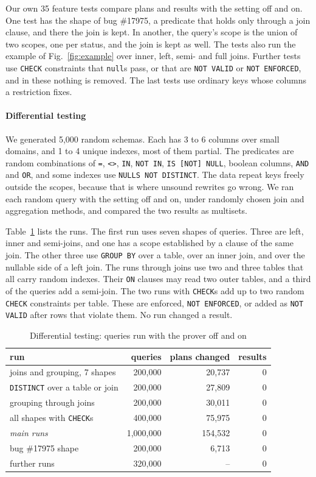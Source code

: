 \documentclass[conference]{IEEEtran}
\theoremstyle{definition}
\newcommand{\sql}[1]{\texttt{#1}}
\newcommand{\nul}{\texttt{null}}
\begin{document}
Our own 35 feature tests compare plans and results with the setting off and on. One test has the shape of bug
\#17975, a predicate that holds only through a join clause, and there the join is kept. In another, the query's scope
is the union of two scopes, one per status, and the join is kept as well. The tests also run the example of
Fig.~\ref{fig:example} over inner, left, semi- and full joins. Further tests use \sql{CHECK} constraints that \nul s
pass, or that are \sql{NOT VALID} or \sql{NOT ENFORCED}, and in these nothing is removed. The last tests use ordinary keys
whose columns a restriction fixes.

\paragraph*{Differential testing} We generated 5{,}000 random schemas. Each has 3 to 6 columns over small domains,
and 1 to 4 unique indexes, most of them partial. The predicates are random combinations of \sql{=}, \sql{<>}, \sql{IN},
\sql{NOT IN}, \sql{IS [NOT] NULL}, boolean columns, \sql{AND} and \sql{OR}, and some indexes use \sql{NULLS NOT DISTINCT}.
The data repeat keys freely outside the scopes, because that is where unsound rewrites go wrong. We ran each random query
with the setting off and on, under randomly chosen join and aggregation methods, and compared the two results as
multisets.

Table~\ref{tab:runs} lists the runs. The first run uses seven shapes of queries. Three are left, inner and semi-joins,
and one has a scope established by a clause of the same join. The other three use \sql{GROUP BY} over a table, over an
inner join, and over the nullable side of a left join. The runs through joins use two and three tables that all carry random indexes. Their \sql{ON}
clauses may read two outer tables, and a third of the queries add a semi-join. The two runs with \sql{CHECK}s add up to two random
\sql{CHECK} constraints per table. These are enforced, \sql{NOT ENFORCED}, or added as \sql{NOT VALID} after rows that
violate them. No run changed a result.

\begin{table}[t]\centering\footnotesize\setlength{\tabcolsep}{3pt}
\caption{Differential testing: queries run with the prover off and on}\label{tab:runs}
\begin{tabular}{@{}lrrr@{}}\toprule
run & queries & plans changed & results\\\midrule
joins and grouping, 7 shapes & 200{,}000 & 20{,}737 & 0\\
\sql{DISTINCT} over a table or join & 200{,}000 & 27{,}809 & 0\\
grouping through joins & 200{,}000 & 30{,}011 & 0\\
all shapes with \sql{CHECK}s & 400{,}000 & 75{,}975 & 0\\\midrule
\emph{main runs} & 1{,}000{,}000 & 154{,}532 & 0\\\midrule
bug \#17975 shape & 200{,}000 & 6{,}713 & 0\\
further runs & 320{,}000 & -- & 0\\\bottomrule
\end{tabular}
\end{table}
\end{document}
